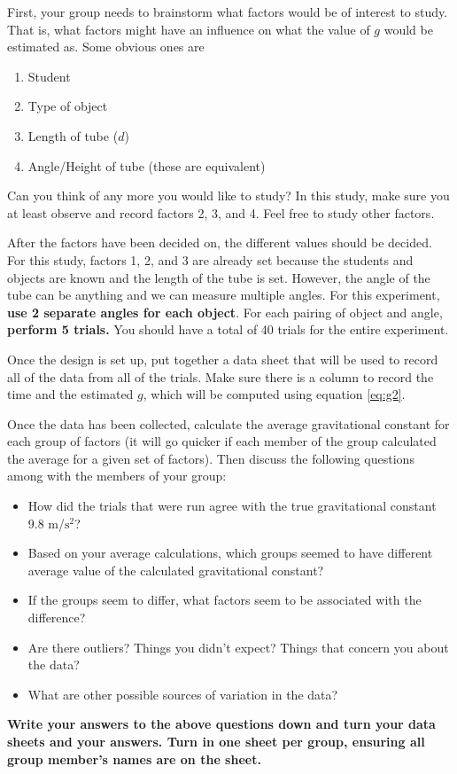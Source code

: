\documentclass[12pt]{article}
\begin{document}
First, your group needs to brainstorm what factors would be of interest to study. That is, what factors might have an influence on what the value of $g$ would be estimated as. Some obvious ones are

\begin{enumerate}
	\item Student
	\item Type of object
	\item Length of tube ($d$)
	\item Angle/Height of tube (these are equivalent)
\end{enumerate}

\noindent Can you think of any more you would like to study? In this study, make sure you at least observe and record factors 2, 3, and 4. Feel free to study other factors.

After the factors have been decided on, the different values should be decided. For this study, factors 1, 2, and 3 are already set because the students and objects are known and the length of the tube is set. However, the angle of the tube can be anything and we can measure multiple angles. For this experiment, \textbf{use 2 separate angles for each object}. For each pairing of object and angle, \textbf{perform 5 trials.} You should have a total of 40 trials for the entire experiment.

Once the design is set up, put together a data sheet that will be used to record all of the data from all of the trials. Make sure there is a column to record the time and the estimated $g$, which will be computed using equation \ref{eq:g2}.

 Once the data has been collected, calculate the average gravitational constant for each group of factors (it will go quicker if each member of the group calculated the average for a given set of factors). Then discuss the following questions among with the members of your group:
 
 \begin{itemize}
 	\item How did the trials that were run agree with the true gravitational constant 9.8 m/$\text{s}^2$?
 	\item Based on your average calculations, which groups seemed to have different average value of the calculated gravitational constant?
 	\item If the groups seem to differ, what factors seem to be associated with the difference?
 	\item Are there outliers? Things you didn't expect? Things that concern you about the data?
 	\item What are other possible sources of variation in the data?
 \end{itemize}
 
\noindent \textbf{Write your answers to the above questions down and turn your data sheets and your answers. Turn in one sheet per group, ensuring all group member's names are on the sheet.}
 
\end{document}

